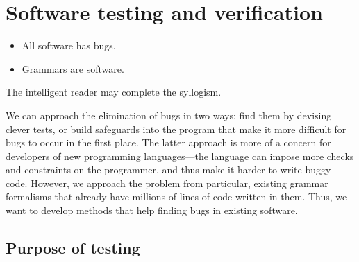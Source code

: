 \section{Software testing and verification}
\label{sec:testing-intro} 


\begin{itemize}
\item All software has bugs.
\item Grammars are software.
\end{itemize}

The intelligent reader may complete the syllogism.

We can approach the elimination of bugs in two ways: find them
by devising clever tests, or build safeguards into the program that
make it more difficult for bugs to occur in the first place. The
latter approach is more of a concern for developers of new programming
languages---the language can impose more checks and constraints on the
programmer, and thus make it harder to write buggy code. However, we
approach the problem from particular, existing grammar formalisms that
already have millions of lines of code written in them. Thus, we want
to develop methods that help finding bugs in existing software.



\subsection{Purpose of testing}

